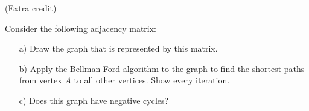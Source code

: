 \documentclass{article}
\begin{document}
\newpage




\begin{problem} (Extra credit)

Consider the following adjacency matrix:
\begin{figure}[h!]
    \centering
\end{figure}
\begin{itemize}
	\item[a)]{} Draw the graph that is represented by this matrix.
	\item[b)]{} Apply the Bellman-Ford algorithm to the graph to find the shortest paths from vertex $A$ to all other vertices.  Show every iteration.
	\item[c)]{} Does this graph have negative cycles?
\end{itemize}
\end{problem}

\begin{solution}
\end{solution}

\end{document}
